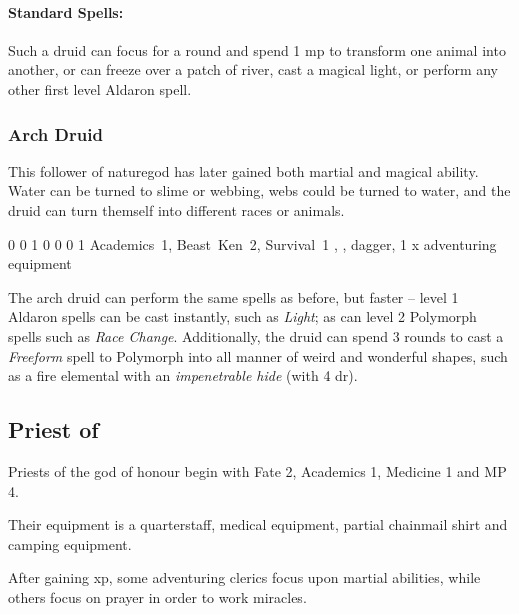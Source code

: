 {\begin{multicols}{2}
\paragraph{Standard Spells:}
Such a druid can focus for a round and spend 1 \gls{mp} to transform one animal into another, or can freeze over a patch of river, cast a magical light, or perform any other first level Aldaron spell.

\subsubsection{Arch Druid}

This follower of \gls{naturegod} has later gained both martial and magical ability.
Water can be turned to slime or webbing, webs could be turned to water, and the druid can turn themself into different races or animals.


{0}%
{0}%
{{1}%
{0}%
{0}}%
{0}%
{1}%
{Academics~1, Beast~Ken~2, Survival~1
}%
{\spear, \partialleather, dagger, 1 x adventuring equipment}%
{\addtocounter{fp}{5}}

The arch druid can perform the same spells as before, but faster -- level 1 Aldaron spells can be cast instantly, such as \textit{Light}; as can level 2 Polymorph spells such as \textit{Race Change}.
Additionally, the druid can spend 3 rounds to cast a \textit{Freeform} spell to Polymorph into all manner of weird and wonderful shapes, such as a fire elemental with an \textit{impenetrable hide} (with 4 \gls{dr}).

\subsection{Priest of }

Priests of the god of honour begin with Fate 2, Academics 1, Medicine 1 and MP 4.

Their equipment is a quarterstaff, medical equipment, partial chainmail shirt and camping equipment.

After gaining \gls{xp}, some adventuring clerics focus upon martial abilities, while others focus on prayer in order to work miracles.



\end{multicols}}

